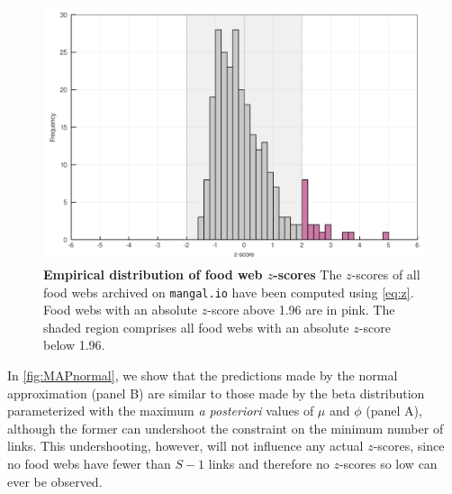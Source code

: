 \documentclass[12pt]{article}
\begin{document}
\begin{figure}
\hypertarget{fig:zscores}{%
\centering
\includegraphics{figures/z-scores.png}
\caption{\textbf{Empirical distribution of food web \(z\)-scores} The
\(z\)-scores of all food webs archived on \texttt{mangal.io} have been
computed using \cref{eq:z}. Food webs with an absolute \(z\)-score above
1.96 are in pink. The shaded region comprises all food webs with an
absolute \(z\)-score below 1.96.}\label{fig:zscores}
}
\end{figure}

In \cref{fig:MAPnormal}, we show that the predictions made by the normal
approximation (panel B) are similar to those made by the beta
distribution parameterized with the maximum \emph{a posteriori} values
of \(\mu\) and \(\phi\) (panel A), although the former can undershoot
the constraint on the minimum number of links. This undershooting,
however, will not influence any actual \(z\)-scores, since no food webs
have fewer than \(S-1\) links and therefore no \(z\)-scores so low can
ever be observed.
\end{document}
